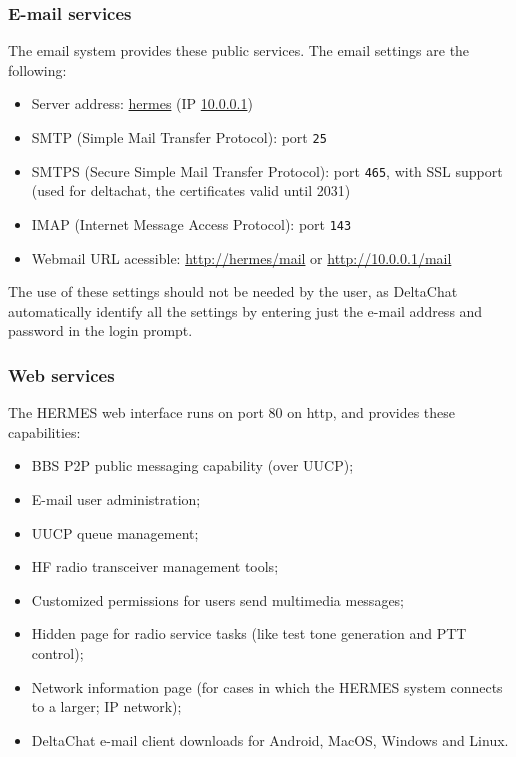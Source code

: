 \documentclass[11pt,a4paper]{article}
\begin{document}
\subsubsection{E-mail services}
\label{apx_net_email}

The email system provides these public services. The email settings are the following:

\begin{itemize}
    \item Server address: \url{hermes} (IP \url{10.0.0.1})
    \item SMTP (Simple Mail Transfer Protocol): port \texttt{25}
    \item SMTPS (Secure Simple Mail Transfer Protocol): port \texttt{465}, with SSL support 
    (used for deltachat, the certificates valid until 2031)
    \item IMAP (Internet Message Access Protocol): port \texttt{143}
    \item Webmail URL acessible: \url{http://hermes/mail} or \url{http://10.0.0.1/mail}
\end{itemize}

The use of these settings should not be needed by the user, as DeltaChat automatically identify all the settings by entering just the e-mail address and password in the login prompt.

\subsubsection{Web services}
\label{apx_net_web}

The HERMES web interface runs on port 80 on http, and provides these capabilities:
\begin{itemize}
    \item BBS P2P public messaging capability (over UUCP);
    \item E-mail user administration;
    \item UUCP queue management;
    \item HF radio transceiver management tools;
    \item Customized permissions for users send multimedia messages;
    \item Hidden page for radio service tasks (like test tone generation and PTT control);
    \item Network information page (for cases in which the HERMES system connects to a larger; IP network);
    \item DeltaChat e-mail client downloads for Android, MacOS, Windows and Linux.
\end{itemize}
\end{document}
